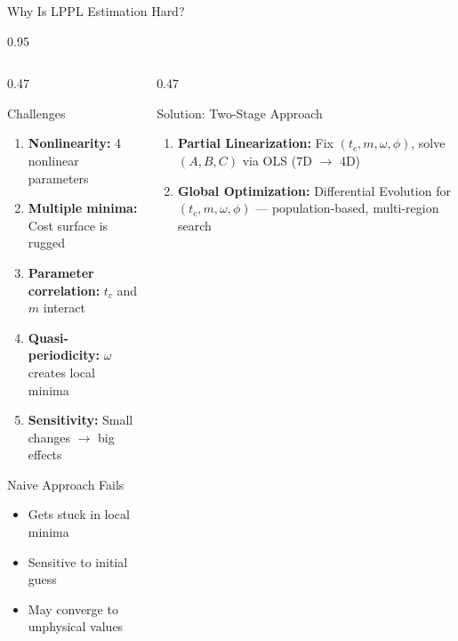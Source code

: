 \documentclass[9pt, aspectratio=169, t]{beamer}
\begin{document}
\begin{frame}{Why Is LPPL Estimation Hard?}
    \begin{cminipage}{0.95\textwidth}
    {\footnotesize
    \begin{columns}[T]
        \begin{column}{0.47\textwidth}
            \begin{alertblock}{Challenges}
                \begin{enumerate}\setlength{\itemsep}{1pt}
                    \item \textbf{Nonlinearity:} 4 nonlinear parameters
                    \item \textbf{Multiple minima:} Cost surface is rugged
                    \item \textbf{Parameter correlation:} $t_c$ and $m$ interact
                    \item \textbf{Quasi-periodicity:} $\omega$ creates local minima
                    \item \textbf{Sensitivity:} Small changes $\to$ big effects
                \end{enumerate}
            \end{alertblock}

            \begin{block}{Naive Approach Fails}
                \begin{itemize}\setlength{\itemsep}{0pt}
                    \item Gets stuck in local minima
                    \item Sensitive to initial guess
                    \item May converge to unphysical values
                \end{itemize}
            \end{block}
        \end{column}
        \begin{column}{0.47\textwidth}
            \begin{exampleblock}{Solution: Two-Stage Approach}
                \begin{enumerate}\setlength{\itemsep}{1pt}
                    \item \textbf{Partial Linearization:} Fix $(t_c, m, \omega, \phi)$, solve $(A, B, C)$ via OLS (7D $\to$ 4D)
                    \item \textbf{Global Optimization:} Differential Evolution for $(t_c, m, \omega, \phi)$ --- population-based, multi-region search
                \end{enumerate}
            \end{exampleblock}


\end{column}
\end{columns}}
\end{cminipage}
\end{frame}
\end{document}
